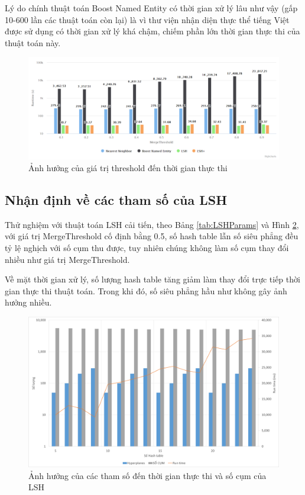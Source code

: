 	Lý do chính thuật toán Boost Named Entity có thời gian xử lý lâu như vậy (gấp 10-600 lần các thuật toán còn lại) là vì thư viện nhận diện thực thể tiếng Việt được sử dụng có thời gian xử lý khá chậm, chiếm phần lớn thời gian thực thi của thuật toán này.
		\begin{figure}
			\centering
			\includegraphics[width=1\linewidth]{Chapter4/Chapter4Figs/ThresholdVsRuntime}
			\caption{Ảnh hưởng của giá trị threshold đến thời gian thực thi}
			\label{fig:thresholdvsruntime}
		\end{figure}

	\subsection{Nhận định về các tham số của LSH}
	Thử nghiệm với thuật toán LSH cải tiến, theo Bảng \ref{tab:LSHParams} và Hình \ref{fig:lshruntime}, với giá trị MergeThreshold cố định bằng 0.5, số hash table lẫn số siêu phẳng đều tỷ lệ nghịch với số cụm thu được, tuy nhiên chúng không làm số cụm thay đổi nhiều như giá trị MergeThreshold.
	
	Về mặt thời gian xử lý, số lượng hash table tăng giảm làm thay đổi trực tiếp thời gian thực thi thuật toán. Trong khi đó, số siêu phẳng hầu như không gây ảnh hưởng nhiều.

	\begin{figure}
		\includegraphics[width=1\linewidth]{Chapter4/Chapter4Figs/LSHRuntime}
		\caption{Ảnh hưởng của các tham số đến thời gian thực thi và số cụm của LSH}
		\label{fig:lshruntime}
	\end{figure}
	
